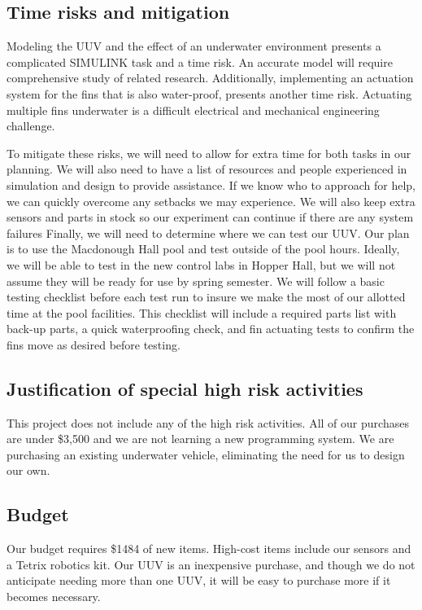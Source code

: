 \documentclass{IEEEtran}
\begin{document}
\subsection{Time risks and mitigation}
Modeling the UUV and the effect of an underwater environment presents a complicated SIMULINK task and a time risk. An accurate model will require comprehensive study of related research. Additionally, implementing an actuation system for the fins that is also water-proof, presents another time risk. Actuating multiple fins underwater is a difficult electrical and mechanical engineering challenge.

To mitigate these risks, we will need to allow for extra time for both tasks in our planning. We will also need to have a list of resources and people experienced in simulation and design to provide assistance. If we know who to approach for help, we can quickly overcome any setbacks we may experience. We will also keep extra sensors and parts in stock so our experiment can continue if there are any system failures Finally, we will need to determine where we can test our UUV. Our plan is to use the Macdonough Hall pool and test outside of the pool hours. Ideally, we will be able to test in the new control labs in Hopper Hall, but we will not assume they will be ready for use by spring semester. We will follow a basic testing checklist before each test run to insure we make the most of our allotted time at the pool facilities. This checklist will include a required parts list with back-up parts, a quick waterproofing check, and fin actuating tests to confirm the fins move as desired before testing.

\subsection{Justification of special high risk activities}
This project does not include any of the high risk activities. All of our purchases are under \$3,500 and we are not learning a new programming system. We are purchasing an existing underwater vehicle, eliminating the need for us to design our own.

\subsection{Budget}
Our budget requires \$1484 of new items. High-cost items include our sensors and a Tetrix robotics kit. Our UUV is an inexpensive purchase, and though we do not anticipate needing more than one UUV, it will be easy to purchase more if it becomes necessary.
\end{document}
